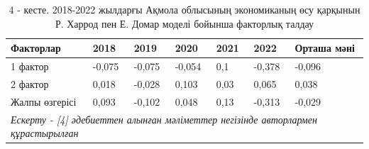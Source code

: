\begin{table}[H]
\caption*{4 - кесте. 2018-2022 жылдарғы Ақмола облысының экономиканың өсу
қарқынын Р. Харрод пен Е. Домар моделі бойынша факторлық талдау}
\centering
\begin{tabular}{|lllllll|}
\hline
\multicolumn{1}{|l|}{Факторлар} &
  \multicolumn{1}{l|}{2018} &
  \multicolumn{1}{l|}{2019} &
  \multicolumn{1}{l|}{2020} &
  \multicolumn{1}{l|}{2021} &
  \multicolumn{1}{l|}{2022} &
  Орташа мәні \\ \hline
\multicolumn{1}{|l|}{1 фактор} &
  \multicolumn{1}{l|}{-0,075} &
  \multicolumn{1}{l|}{-0,075} &
  \multicolumn{1}{l|}{-0,054} &
  \multicolumn{1}{l|}{0,1} &
  \multicolumn{1}{l|}{-0,378} &
  -0,096 \\ \hline
\multicolumn{1}{|l|}{2 фактор} &
  \multicolumn{1}{l|}{0,018} &
  \multicolumn{1}{l|}{-0,028} &
  \multicolumn{1}{l|}{0,103} &
  \multicolumn{1}{l|}{0,03} &
  \multicolumn{1}{l|}{0,065} &
  0,038 \\ \hline
\multicolumn{1}{|l|}{Жалпы өзгерісі} &
  \multicolumn{1}{l|}{0,093} &
  \multicolumn{1}{l|}{-0,102} &
  \multicolumn{1}{l|}{0,048} &
  \multicolumn{1}{l|}{0,13} &
  \multicolumn{1}{l|}{-0,313} &
  -0,029 \\ \hline
\multicolumn{7}{|l|}{\textit{Ескерту - {[}4{]} әдебиеттен алынған мәліметтер негізінде авторлармен құрастырылған}} \\ \hline
\end{tabular}
\end{table}

